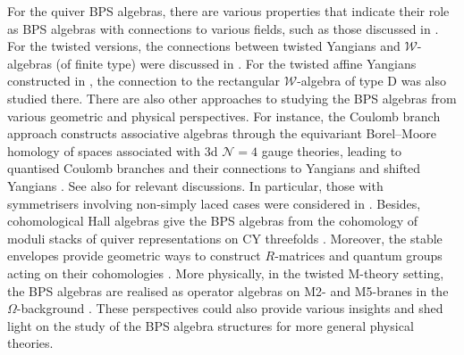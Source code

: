 \documentclass[11pt]{article}
\numberwithin{equation}{section}
\numberwithin{figure}{section}
\numberwithin{table}{section}
\begin{document}
For the quiver BPS algebras, there are various properties that indicate their role as BPS algebras with connections to various fields, such as those discussed in \cite{Litvinov:2020zeq,Chistyakova:2021yyd,Kolyaskin:2022tqi,Bao:2022fpk,Galakhov:2022uyu,ueda2022affine,kodera2022coproduct,Bao:2022jhy,ueda2025example,ueda2024guay,Negut:2023iia,Bao:2023ece,ueda2026coproduct,ueda2025affine1,ueda2025affine2,Negut:2026lzn,Negut:2026ugx,Li:2023zub,Galakhov:2023aev,Galakhov:2023mak,Galakhov:2023mpc,Galakhov:2024mbz,Galakhov:2024foa,Galakhov:2024bzs,Galakhov:2024cry,Galakhov:2024zqn,Galakhov:2025phf,Matsuo:2023lky,Kimura:2023bxy,Kimura:2024xpr,Kimura:2024osv,Noshita:2025bzg,Kimura:2025lfo}. For the twisted versions, the connections between twisted Yangians and $\mathcal{W}$-algebras (of finite type) were discussed in \cite{brown2009twisted,lu2025shiftedtwistedyangiansfinite,lu2026representationsshiftedsuperyangians}. For the twisted affine Yangians constructed in \cite{ueda2025twisted}, the connection to the rectangular $\mathcal{W}$-algebra of type D was also studied there. There are also other approaches to studying  the BPS algebras from various geometric and physical perspectives. For instance, the Coulomb branch approach constructs associative algebras through the equivariant Borel--Moore homology of spaces associated with 3d $\mathcal{N}=4$ gauge theories, leading to quantised Coulomb branches and their connections to Yangians and shifted Yangians \cite{Braverman:2016pwk,Braverman:2016wma}. See also \cite{Chen:2025xoe} for relevant discussions. In particular, those with symmetrisers involving non-simply laced cases were considered in \cite{Nakajima:2019olw}. Besides, cohomological Hall algebras give the BPS algebras from the cohomology of moduli stacks of quiver representations on CY threefolds \cite{Kontsevich:2010px,Davison:2013nza,Davison:2016bjk,Rapcak:2020ueh,davison2025bpsalgebrasgeneralisedkacmoody,Butson:2023eid,botta2025okounkovsconjecturebpslie,schiffmann2024cohomologicalhallalgebrasquivers}. Moreover, the stable envelopes provide geometric ways to construct $R$-matrices and quantum groups acting on their cohomologies \cite{maulik2018quantumgroupsquantumcohomology,Aganagic:2016jmx,Okounkov_2021,dinkins2021ellipticstableenvelopesaffine,Botta_2023,Ishtiaque:2023acr,Cao:2025yng,Cao:2026pir,Cao:2026vwf,Dedushenko:2021mds,Dedushenko:2023qjq}. More physically, in the twisted M-theory setting, the BPS algebras are realised as operator algebras on M2- and M5-branes in the $\Omega$-background \cite{Costello:2013zra,Costello:2016nkh,Costello:2017fbo,Gaiotto:2019wcc,Oh:2020hph,Oh:2021wes,Gaiotto:2020dsq,Gaiotto:2023ynn,Ashwinkumar:2024vys,Ishtiaque:2024orn}. These perspectives could also provide various insights and shed light on the study of the BPS algebra structures for more general physical theories.
\end{document}
